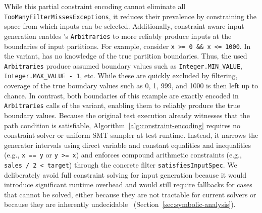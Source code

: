 While this partial constraint encoding
cannot eliminate all \texttt{Too\-Many\-Filter\-Misses\-Exceptions},
it reduces their prevalence by constraining
the space from which inputs can be selected.
Additionally, constraint-aware input generation
enables \ToolJqwik{}'s \texttt{Arbitraries}
to more reliably produce inputs at the boundaries of input partitions.
For example, consider \texttt{x >= 0 \&\& x <= 1000}.
In the \VariantNaive{} variant, \ToolJqwik{} has no knowledge of the true
partition boundaries. Thus,
the used \texttt{Arbitraries} produce assumed boundary values such
as \texttt{Integer.MIN\_VALUE}, \texttt{Integer.MAX\_VALUE - 1}, etc.
While these are quickly excluded by filtering, coverage of the true
boundary values such as 0, 1, 999, and 1000 is then left up to chance.
In contrast, both boundaries of this example are exactly encoded
in \texttt{Arbitraries} calls of the \VariantImproved{} variant,
enabling them to reliably produce the true boundary values.
Because the original test execution already witnesses that the path condition is satisfiable, Algorithm~\ref{alg:constraint-encoding} requires no constraint solver or uniform SMT sampler at test runtime.
Instead, it narrows the generator intervals using direct variable and constant equalities and inequalities (e.g., \texttt{x == y} or \texttt{y >= x}) and enforces compound arithmetic constraints (e.g., \texttt{sales / 2 < target}) through the concrete filter \texttt{satisfiesInputSpec}.
We deliberately avoid full constraint solving for input generation
because it would introduce significant runtime overhead
and would still require fallbacks for cases that cannot be solved,
either because they are not tractable for current solvers
or because they are inherently undecidable~\cite{cadar_2013_symbolic,baldoni_2018_survey} (Section~\ref{sec:symbolic-analysis}).
